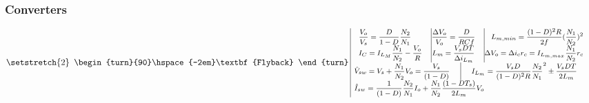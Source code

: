 \documentclass[twocolumn]{article}
\begin{document}
\subsubsection*{Converters}
\vspace*{-0.2cm}
\begin{equation}
{\setstretch{2}
\begin{array}{c|c}
{\begin{turn}{90}\hspace{-2em}\textbf{Flyback} \end{turn}} \hspace{-0.1cm} & \hspace{-0.2cm}
{\begin{array}{l}
\begin{array}{r  c  c}
\textrm{\footnotesize $\displaystyle  \frac{V_o}{V_s} = \frac{D}{1-D} \frac{N_2}{N_1}$}\hfill &\vline \hfill \textrm{\footnotesize $\displaystyle  \frac{\Delta V_o}{V_o} = \frac{D}{RCf} $} \hfill&\vline\hfill \textrm{\footnotesize $ \displaystyle   L_{m,min} = \frac{(1-D)^2R}{2f}(\frac{N_1}{N_2})^2 $} \nonumber\\
\textrm{\footnotesize $\displaystyle I_C=I_{L_M} \frac{N_1}{N_2}- \frac{V_o }{R}$}\hfill &\vline \hfill\textrm{\footnotesize $\displaystyle  L_m = \frac{V_s D T}{\Delta i_{L_m}}$}\hfill &\vline\hfill \textrm{\footnotesize $ \displaystyle \Delta V_o =\Delta i_c r_c = I_{L_{m,max}}\frac{N_1}{N_2} r_c $}\nonumber\\
\end{array}\\
\textrm{\footnotesize $\displaystyle \hat{V}_{sw} = V_s + \frac{N_1}{N_2}V_o= \frac{V_s}{(1-D)}$} \hfill \vline \hfill \textrm{\footnotesize $\displaystyle I_{L_{m}} = \frac{V_sD}{(1-D)^2R}\frac{N_2}{N_1}^2\pm \displaystyle \frac{V_sDT}{2L_m}$}\hfill\\
\textrm{\footnotesize $\displaystyle \hat{I}_{sw} = \frac{1}{(1-D)}\frac{N_2}{N_1} I_o+\displaystyle \frac{N_1}{N_2}\frac{(1-D T_s)}{2L_m}V_o$\vspace{0.4cm}}\\
\end{array}}
\end{array}}
\end{equation}
\end{document}

